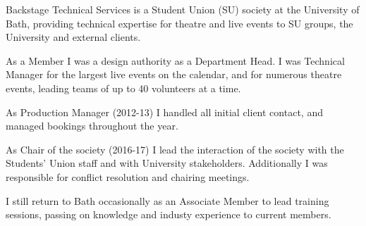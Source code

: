 \vspace{6pt}


Backstage Technical Services is a Student Union (SU) society at the University of Bath, providing technical expertise for theatre and live events to SU groups, the University and external clients.
\begin{tightemize}
    \item As a Member I was a design authority as a Department Head. I was Technical Manager for the largest live events on the calendar, and for numerous theatre events, leading teams of up to 40 volunteers at a time. 
    
    \item As Production Manager (2012-13) I handled all initial client contact, and managed bookings throughout the year.
    
    \item As Chair of the society (2016-17) I lead the interaction of the society with the Students' Union staff and with University stakeholders. Additionally I was responsible for conflict resolution and chairing meetings.
    
    \item I still return to Bath occasionally as an Associate Member to lead training sessions, passing on knowledge and industy experience to current members.
\end{tightemize}
\sectionsep